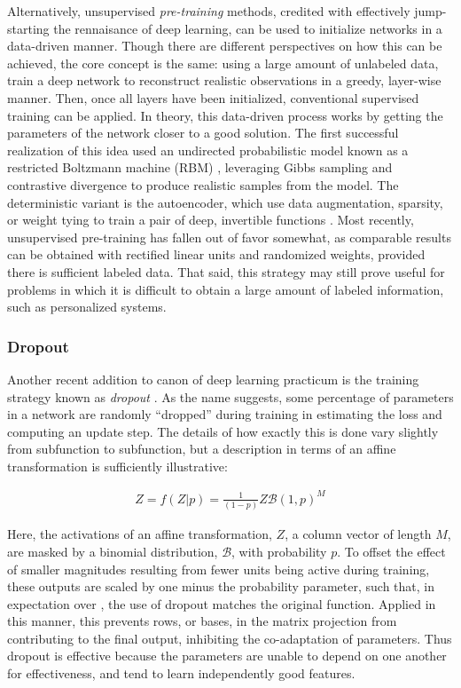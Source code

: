 Alternatively, unsupervised \emph{pre-training} methods, credited with effectively jump-starting the rennaisance of deep learning, can be used to initialize networks in a data-driven manner.
Though there are different perspectives on how this can be achieved, the core concept is the same:
using a large amount of unlabeled data, train a deep network to reconstruct realistic observations in a greedy, layer-wise manner.
Then, once all layers have been initialized, conventional supervised training can be applied.
In theory, this data-driven process works by getting the parameters of the network closer to a good solution.
The first successful realization of this idea used an undirected probabilistic model known as a restricted Boltzmann machine (RBM) \cite{Hinton2006}, leveraging Gibbs sampling and contrastive divergence to produce realistic samples from the model.
The deterministic variant is the autoencoder, which use data augmentation, sparsity, or weight tying to train a pair of deep, invertible functions \cite{Courville, Bengio, Vincent}.
Most recently, unsupervised pre-training has fallen out of favor somewhat, as comparable results can be obtained with rectified linear units and randomized weights, provided there is sufficient labeled data.
That said, this strategy may still prove useful for problems in which it is difficult to obtain a large amount of labeled information, such as personalized systems.


\subsubsection{Dropout}

Another recent addition to canon of deep learning practicum is the training strategy known as \emph{dropout} \cite{Hinton2012}.
As the name suggests, some percentage of parameters in a network are randomly ``dropped'' during training in estimating the loss and computing an update step.
The details of how exactly this is done vary slightly from subfunction to subfunction, but a description in terms of an affine transformation is sufficiently illustrative:

\begin{align*}
Z = f(Z | p) = \frac{1}{(1 - p)} Z \mathcal{B}(1, p)^M
\end{align*}

\noindent Here, the activations of an affine transformation, $Z$, a column vector of length $M$, are masked by a binomial distribution, $\mathcal{B}$, with probability $p$.
To offset the effect of smaller magnitudes resulting from fewer units being active during training, these outputs are scaled by one minus the probability parameter, such that, in expectation over , the use of dropout matches the original function.
Applied in this manner, this prevents rows, or bases, in the matrix projection from contributing to the final output, inhibiting the co-adaptation of parameters.
Thus dropout is effective because the parameters are unable to depend on one another for effectiveness, and tend to learn independently good features.

